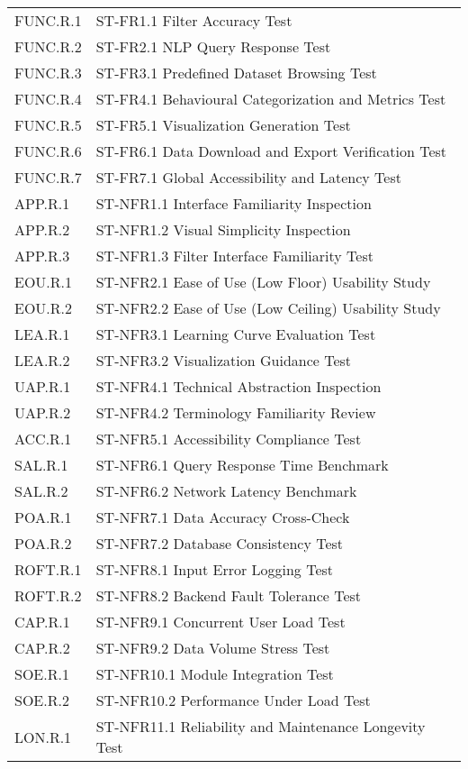 \documentclass[12pt, titlepage]{article}
\begin{document}
\begin{longtable}{|l|p{10cm}|}
FUNC.R.1 & ST-FR1.1 Filter Accuracy Test \\
FUNC.R.2 & ST-FR2.1 NLP Query Response Test \\
FUNC.R.3 & ST-FR3.1 Predefined Dataset Browsing Test \\
FUNC.R.4 & ST-FR4.1 Behavioural Categorization and Metrics Test \\
FUNC.R.5 & ST-FR5.1 Visualization Generation Test \\
FUNC.R.6 & ST-FR6.1 Data Download and Export Verification Test \\
FUNC.R.7 & ST-FR7.1 Global Accessibility and Latency Test \\
APP.R.1 & ST-NFR1.1 Interface Familiarity Inspection \\
APP.R.2 & ST-NFR1.2 Visual Simplicity Inspection \\
APP.R.3 & ST-NFR1.3 Filter Interface Familiarity Test \\
EOU.R.1 & ST-NFR2.1 Ease of Use (Low Floor) Usability Study \\
EOU.R.2 & ST-NFR2.2 Ease of Use (Low Ceiling) Usability Study \\
LEA.R.1 & ST-NFR3.1 Learning Curve Evaluation Test \\
LEA.R.2 & ST-NFR3.2 Visualization Guidance Test \\
UAP.R.1 & ST-NFR4.1 Technical Abstraction Inspection \\
UAP.R.2 & ST-NFR4.2 Terminology Familiarity Review \\
ACC.R.1 & ST-NFR5.1 Accessibility Compliance Test \\
SAL.R.1 & ST-NFR6.1 Query Response Time Benchmark \\
SAL.R.2 & ST-NFR6.2 Network Latency Benchmark \\
POA.R.1 & ST-NFR7.1 Data Accuracy Cross-Check \\
POA.R.2 & ST-NFR7.2 Database Consistency Test \\
ROFT.R.1 & ST-NFR8.1 Input Error Logging Test \\
ROFT.R.2 & ST-NFR8.2 Backend Fault Tolerance Test \\
CAP.R.1 & ST-NFR9.1 Concurrent User Load Test \\
CAP.R.2 & ST-NFR9.2 Data Volume Stress Test \\
SOE.R.1 & ST-NFR10.1 Module Integration Test \\
SOE.R.2 & ST-NFR10.2 Performance Under Load Test \\
LON.R.1 & ST-NFR11.1 Reliability and Maintenance Longevity Test \\

\end{longtable}
\end{document}
